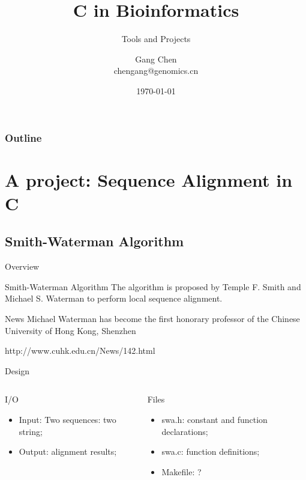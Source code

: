 \documentclass[UTF8]{beamer}
\title{C in Bioinformatics}
\subtitle{Tools and Projects}
\author{Gang Chen\\ chengang@genomics.cn}
\date{\today}
\begin{document}
\begin{frame}
\titlepage
\end{frame}
\begin{frame}[t]\frametitle{Outline}
\tableofcontents[hideallsubsections]
\end{frame}

\section{A project: Sequence Alignment in C}

\subsection{Smith-Waterman Algorithm}
\begin{frame}[t]{Overview}
\begin{block}{Smith-Waterman Algorithm}
  The algorithm is proposed by Temple F. Smith and Michael S. Waterman to
  perform local sequence alignment.
\end{block}

\begin{block}{News}
  Michael Waterman has become the first honorary professor of the Chinese
  University of Hong Kong, Shenzhen

  http://www.cuhk.edu.cn/News/142.html
\end{block}

\end{frame}

\begin{frame}[t]{Design}
\begin{columns}
  \begin{column}{.5\textwidth}
\begin{block}{I/O}
  \begin{itemize}
    \item Input: Two sequences: two string;
    \item Output: alignment results;
  \end{itemize}
\end{block}
\end{column}

\begin{column}{.5\textwidth}
\begin{block}{Files}
  \begin{itemize}
    \item swa.h: constant and function declarations;
    \item swa.c: function definitions;
    \item Makefile: ?
  \end{itemize}
\end{block}
\end{column}
\end{columns}
\end{frame}
\end{document}

